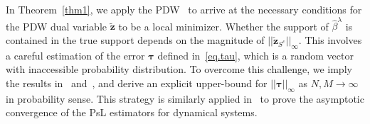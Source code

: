 \documentclass[a4paper,11pt]{article}
\newcommand{\btau}{\bm{\tau}}
\theoremstyle{definition}
\begin{document}
In Theorem~\ref{thm1}, we apply the PDW~\cite{wainwright2009sharp} to arrive at the necessary conditions for the PDW dual variable $\widetilde{\mathbf{z}}$ to be a local minimizer. Whether the support of $\widehat{\beta}^\lambda$ is contained in the true support depends on the magnitude of $||\check{\mathbf{z}}_{S^c}||_\infty$.  This involves a careful estimation of the error $\btau$ defined in~\eqref{eq.tau}, which is a random vector with inaccessible probability distribution.  To overcome this challenge, we imply the results in~\cite{fan1997local} and~\cite{mack1982weak}, and derive an explicit upper-bound  for $||\btau||_\infty$ as $N,M\to\infty$ in probability sense. This strategy is similarly applied in~\cite{liang2008parameter} to prove the asymptotic convergence of the PsL estimators for dynamical systems. %
\end{document}

